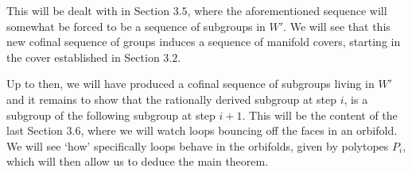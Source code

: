 \noindent
This will be dealt with in Section \(3.5\), where the aforementioned sequence will somewhat be forced to be a sequence of subgroups in \(W'\).
We will see that this new cofinal sequence of groups induces a sequence of manifold covers, starting in the cover established in Section \(3.2\).

\noindent
Up to then, we will have produced a cofinal sequence of subgroups living in \(W'\) and it remains to show that the rationally derived subgroup at step \(i\), is a subgroup of the following subgroup at step \(i+1\).
This will be the content of the last Section \(3.6\), where we will watch loops bouncing off the faces in an orbifold.
We will see `how' specifically loops behave in the orbifolds, given by polytopes \(P_i\), which will then allow us to deduce the main theorem. 